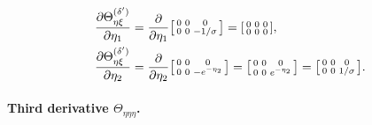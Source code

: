 \documentclass{article}
\begin{document}
\begin{align}
  \frac{\partial \Theta_{\eta\xi}^{(\delta')}}{\partial \eta_1} & = \frac{\partial}{\partial \eta_1} \begin{bsmallmatrix} 0 & 0 & 0 \\ 0 & 0 & -1/\sigma \end{bsmallmatrix} = \begin{bsmallmatrix} 0 & 0 & 0 \\ 0 & 0 & 0 \end{bsmallmatrix},                                   \\
  \frac{\partial \Theta_{\eta\xi}^{(\delta')}}{\partial \eta_2} & = \frac{\partial}{\partial \eta_2} \begin{bsmallmatrix} 0 & 0 & 0 \\ 0 & 0 & -e^{-\eta_2} \end{bsmallmatrix} = \begin{bsmallmatrix} 0 & 0 & 0 \\ 0 & 0 & e^{-\eta_2} \end{bsmallmatrix} = \begin{bsmallmatrix} 0 & 0 & 0 \\ 0 & 0 & 1/\sigma \end{bsmallmatrix}.
\end{align}

\paragraph{Third derivative $\Theta_{\eta\eta\eta}$.}
\end{document}
